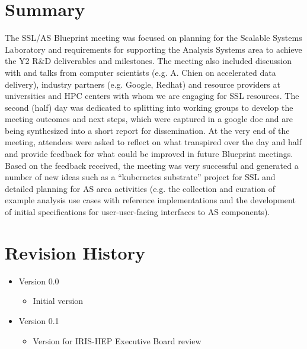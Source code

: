 \documentclass[11pt,letterpaper,fleqn]{article}
\begin{document}
\section{Summary}
The SSL/AS Blueprint meeting was focused on planning for the Scalable Systems Laboratory and requirements for supporting the Analysis Systems area to achieve the Y2 R\&D deliverables and milestones. The meeting also included discussion with and talks from computer scientists (e.g. A. Chien on accelerated data delivery), industry partners (e.g. Google, Redhat) and resource providers at universities and HPC centers with whom we are engaging for SSL resources. The second (half) day was dedicated to splitting into working groups to develop the meeting outcomes and next steps, which were captured in a google doc and are being synthesized into a short report for dissemination. At the very end of the meeting, attendees were asked to reflect on what transpired over the day and half and provide feedback for what could be improved in future Blueprint meetings. Based on the feedback received, the meeting was very successful and generated a number of new ideas such as a “kubernetes substrate” project for SSL and detailed planning for AS area activities (e.g. the collection and curation of example analysis use cases with reference implementations and the development of initial specifications for user-user-facing interfaces to AS components).


\appendix
\newpage
\section{Revision History}

\vspace{8pt}
\begin{itemize}
  \item Version 0.0
  \vspace{-5pt}
  \begin{itemize}
    \item Initial version
  \end{itemize}
  \item Version 0.1
  \vspace{-5pt}
  \begin{itemize}
    \item Version for IRIS-HEP Executive Board review
  \end{itemize}
\end{itemize}
\end{document}
